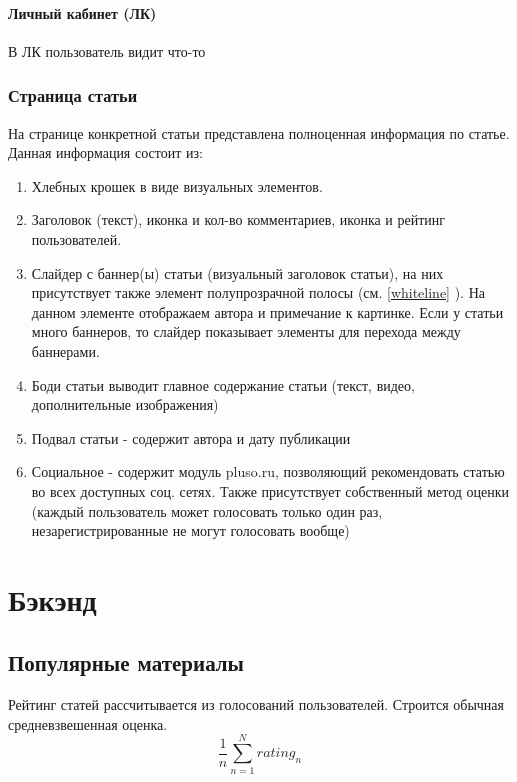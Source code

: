 \documentclass[12pt]{article} %
\begin{document}
\paragraph{Личный кабинет (ЛК)}
В ЛК пользователь видит что-то 


\subsubsection{Страница статьи}
На странице конкретной статьи представлена полноценная информация по статье. Данная информация состоит из:

\begin{enumerate}
    \item Хлебных крошек в виде визуальных элементов. 
    \item Заголовок (текст), иконка и кол-во комментариев, иконка и рейтинг пользователей.
    \item Слайдер с баннер(ы) статьи (визуальный заголовок статьи), на них присутствует также элемент полупрозрачной полосы (см. \ref{whiteline} ). На данном элементе отображаем автора и примечание к картинке. Если у статьи много баннеров, то слайдер показывает элементы для перехода между баннерами.
    \item Боди статьи выводит главное содержание статьи (текст, видео, дополнительные изображения)
    \item Подвал статьи - содержит автора и дату публикации
    \item Социальное - содержит модуль pluso.ru, позволяющий рекомендовать статью во всех доступных соц. сетях. Также присутствует собственный метод оценки (каждый пользователь может голосовать только один раз, незарегистрированные не могут голосовать вообще)
\end{enumerate}


\section{Бэкэнд}

\subsection{Популярные материалы}
Рейтинг статей рассчитывается из голосований пользователей. Строится обычная средневзвешенная оценка.
\begin{equation}
    \frac{1}{n} \sum\limits_{n=1}^{N} rating_n     
\end{equation}
\end{document}
